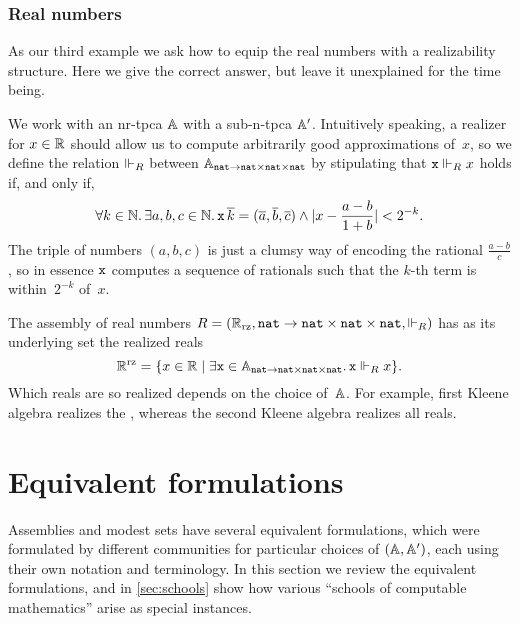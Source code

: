 \subsubsection{Real numbers}
\label{sec:asm-real-numbers}

As our third example we ask how to equip the real numbers with a realizability structure. Here we give the correct answer, but leave it unexplained for the time being.

We work with an nr-tpca $\AA$ with a sub-n-tpca $\subAA$. Intuitively speaking, a realizer for $x \in \RR$ should allow us to compute arbitrarily good approximations of~$x$, so we define the relation $\rz[R]$ between $\Atyp{\ttnat \to \ttnat \times \ttnat \times \ttnat}$ by stipulating that $\R{x} \rz[R] x$ holds if, and only if,
%
\begin{equation*}
  \all{k \in \NN} \some{a, b, c \in \NN}
  \R{x} \, \overline{k} = (\overline{a}, \overline{b}, \overline{c})
  \land |x - \frac{a - b}{1 + b}| < 2^{-k}.
\end{equation*}
%
The triple of numbers $(a, b, c)$ is just a clumsy way of encoding the rational $\frac{a - b}{c}$, so in essence $\R{x}$ computes a sequence of rationals such that the $k$-th term is within~$2^{-k}$ of~$x$.

The assembly of real numbers $R = (\RR_{\mathrm{rz}}, \ttnat \to \ttnat \times \ttnat \times \ttnat, {\rz[R]})$ has as its underlying set the realized reals
%
\begin{equation*}
  \RR^{\mathrm{rz}}
  = \set{x \in \RR \such \some{\R{x} \in \Atyp{\ttnat \to \ttnat \times \ttnat \times \ttnat}} \R{x} \rz[R] x}.
\end{equation*}
%
Which reals are so realized depends on the choice of~$\AA$. For example, first Kleene algebra realizes the , whereas the second Kleene algebra realizes all reals.

\section{Equivalent formulations}
\label{sec:equivalent-formulations}

Assemblies and modest sets have several equivalent formulations, which were formulated by different communities for particular choices of $(\AA, \subAA)$, each using their own notation and terminology. In this section we review the equivalent formulations, and in \cref{sec:schools} show how various ``schools of computable mathematics'' arise as special instances.

